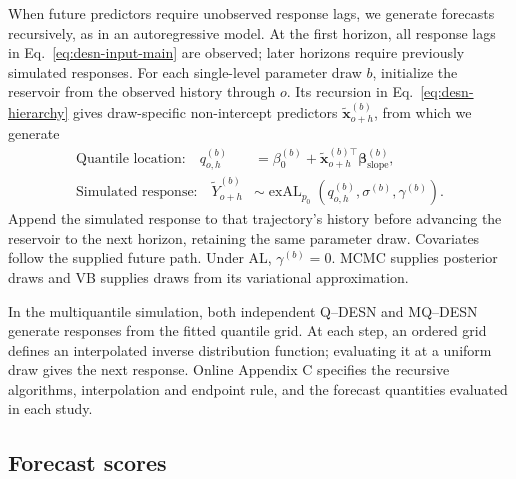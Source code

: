 \documentclass[12pt,letterpaper]{article}
\numberwithin{equation}{section}
\newcommand{\vect}[1]{\bm{#1}}
\newcommand{\exAL}{\operatorname{exAL}}
\begin{document}
When future predictors require unobserved response lags, we generate
forecasts recursively, as in an autoregressive model. At the first horizon,
all response lags in Eq.~\eqref{eq:desn-input-main} are
observed; later horizons require previously simulated responses. For each
single-level parameter draw \(b\), initialize the reservoir from the observed
history through \(o\). Its recursion in Eq.~\eqref{eq:desn-hierarchy}
gives draw-specific non-intercept predictors
\(\tilde{\vect x}_{o+h}^{(b)}\), from which we generate
\begin{equation}
\begin{aligned}
\text{Quantile location:}\quad
q_{o,h}^{(b)}
&=\beta_0^{(b)}+
\tilde{\vect x}_{o+h}^{(b)\top}\vect\beta_{\mathrm{slope}}^{(b)},\\
\text{Simulated response:}\quad
\tilde Y_{o+h}^{(b)}
&\sim\exAL_{p_0}\!\left(q_{o,h}^{(b)},\sigma^{(b)},\gamma^{(b)}\right).
\end{aligned}
\label{eq:forecast-location-main}
\end{equation}
Append the simulated response to that trajectory's history before advancing
the reservoir to the next horizon, retaining the same parameter draw.
Covariates follow the supplied future path. Under AL, \(\gamma^{(b)}=0\).
MCMC supplies posterior draws and VB supplies draws from its variational
approximation.

In the multiquantile simulation, both independent Q--DESN and MQ--DESN
generate responses from the fitted quantile grid. At each step, an ordered
grid defines an interpolated inverse distribution function; evaluating it
at a uniform draw gives the next response. Online Appendix C specifies the
recursive algorithms, interpolation and endpoint rule, and the forecast
quantities evaluated in each study.

\subsection{Forecast scores}
\end{document}
